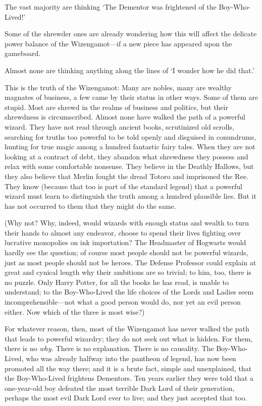 The vast majority are thinking `The Dementor was frightened of the
Boy-Who-Lived!'

Some of the shrewder ones are already wondering how this will affect the
delicate power balance of the Wizengamot---if a new piece has appeared upon the
gameboard.

Almost none are thinking anything along the lines of `I wonder how he did that.'

This is the truth of the Wizengamot: Many are nobles, many are wealthy magnates
of business, a few came by their status in other ways. Some of them are stupid.
Most are shrewd in the realms of business and politics, but their shrewdness is
circumscribed. Almost none have walked the path of a powerful wizard. They have
not read through ancient books, scrutinized old scrolls, searching for truths
too powerful to be told openly and disguised in conundrums, hunting for true magic
among a hundred fantastic fairy tales. When they are not looking at a contract
of debt, they abandon what shrewdness they possess and relax with some
comfortable nonsense. They believe in the Deathly Hallows, but they also
believe that Merlin fought the dread Totoro and imprisoned the Ree. They know
(because that too is part of the standard legend) that a powerful wizard must
learn to distinguish the truth among a hundred plausible lies. But it has not
occurred to them that they might do the same.

(Why not? Why, indeed, would wizards with enough status and wealth to turn
their hands to almost any endeavor, choose to spend their lives fighting over
lucrative monopolies on ink importation? The Headmaster of Hogwarts would
hardly see the question; of course most people should not be powerful wizards,
just as most people should not be heroes. The Defense Professor could explain
at great and cynical length why their ambitions are so trivial; to him, too,
there is no puzzle. Only Harry Potter, for all the books he has read, is unable
to understand; to the Boy-Who-Lived the life choices of the Lords and Ladies
seem incomprehensible---not what a good person would do, nor yet an evil person
either. Now which of the three is most wise?)

For whatever reason, then, most of the Wizengamot has never walked the path
that leads to powerful wizardry; they do not seek out what is hidden. For them,
there is no \emph{why.} There is no explanation. There is no causality. The
Boy-Who-Lived, who was already halfway into the pantheon of legend, has now
been promoted all the way there; and it is a brute fact, simple and
unexplained, that the Boy-Who-Lived frightens Dementors. Ten years earlier they
were told that a one-year-old boy defeated the most terrible Dark Lord of their
generation, perhaps the most evil Dark Lord ever to live; and they just
accepted that too.

